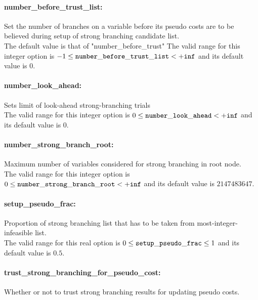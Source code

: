 \paragraph{number\_before\_trust\_list:}\label{sec:number_before_trust_list} Set the number of branches on a variable before its pseudo costs are to be believed during setup of strong branching candidate list. $\;$ \\
 The default value is that of
"number\_before\_trust" The valid range for this integer option is
$-1 \le {\tt number\_before\_trust\_list } <  {\tt +inf}$
and its default value is $0$.


\paragraph{number\_look\_ahead:}\label{sec:number_look_ahead} Sets limit of look-ahead strong-branching trials $\;$ \\
 The valid range for this integer option is
$0 \le {\tt number\_look\_ahead } <  {\tt +inf}$
and its default value is $0$.


\paragraph{number\_strong\_branch\_root:}\label{sec:number_strong_branch_root} Maximum number of variables considered for strong branching in root node. $\;$ \\
 The valid range for this integer option is
$0 \le {\tt number\_strong\_branch\_root } <  {\tt +inf}$
and its default value is $2147483647$.


\paragraph{setup\_pseudo\_frac:}\label{sec:setup_pseudo_frac} Proportion of strong branching list that has to be taken from most-integer-infeasible list. $\;$ \\
 The valid range for this real option is 
$0 \le {\tt setup\_pseudo\_frac } \le 1$
and its default value is $0.5$.


\paragraph{trust\_strong\_branching\_for\_pseudo\_cost:}\label{sec:trust_strong_branching_for_pseudo_cost} Whether or not to trust strong branching results for updating pseudo costs. $\;$ \\

